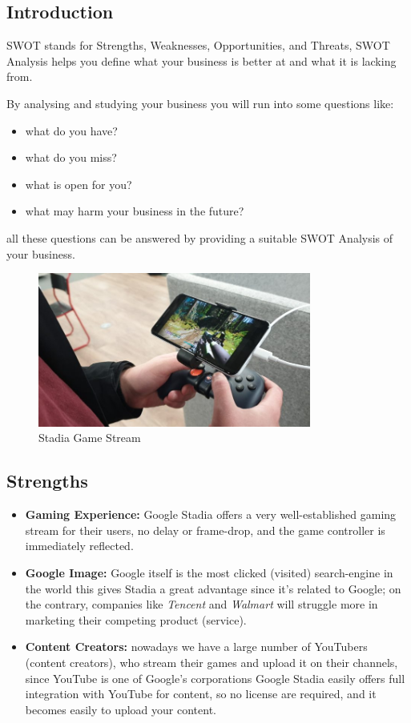 \subsection{Introduction}

SWOT stands for Strengths, Weaknesses, Opportunities, and Threats, SWOT Analysis helps you define
what your business is better at and what it is lacking from.

By analysing and studying your business you will run into some questions like:
{
\renewcommand\labelitemi{}
\begin{itemize}
    \item what do you have?
    \item what do you miss?
    \item what is open for you?
    \item what may harm your business in the future?
\end{itemize}
}
all these questions can be answered by providing a suitable SWOT Analysis of your business.

\begin{figure}[h]
    \centering
    \includegraphics[width=0.8\textwidth]{images/stream.jpg}
    \caption{Stadia Game Stream}
    \label{fig:stream}
\end{figure}

\subsection{Strengths}
    \begin{itemize}
        \item \textbf{Gaming Experience:}
            Google Stadia offers a very well-established gaming stream for 
            their users, no delay or frame-drop, and the game controller is immediately reflected.
        \item \textbf{Google Image:}
            Google itself is the most clicked (visited) search-engine in the world
            this gives Stadia a great advantage since it's related to Google; on the contrary, companies
            like \emph{Tencent} and \emph{Walmart} will struggle more in marketing their competing product (service).
        \item \textbf{Content Creators:} 
            nowadays we have a large number of YouTubers (content creators), who stream their games and 
            upload it on their channels, since YouTube is one of Google's corporations Google Stadia
            easily offers full integration with YouTube for content, so no license are required, and 
            it becomes easily to upload your content.
    \end{itemize}

